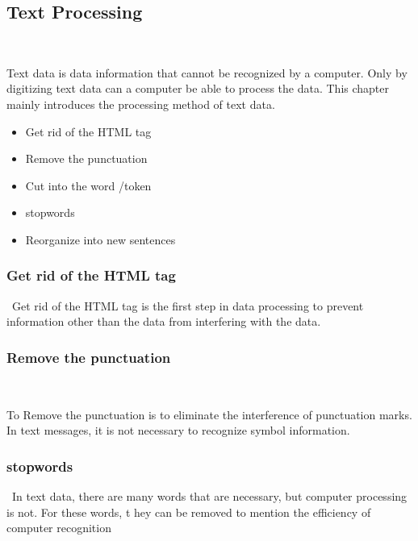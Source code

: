 \subsection{Text Processing}
\

Text data is data information that cannot be recognized by a computer. 
Only by digitizing text data can a computer be able to process the data.
This chapter mainly introduces the processing method of text data.

\begin{itemize}
	\item Get rid of the HTML tag
  \item Remove the punctuation
  \item Cut into the word /token
  \item stopwords
  \item Reorganize into new sentences
  \end{itemize}
\subsubsection{Get rid of the HTML tag}
\
Get rid of the HTML tag is the first step 
in data processing to prevent information other than the data 
from interfering with the data.


\subsubsection{Remove the punctuation}
\

To Remove the punctuation is to eliminate 
the interference of punctuation marks. In text messages, 
it is not necessary to recognize symbol information.
\subsubsection{stopwords}
\
In text data, there are many words that are necessary, 
but computer processing is not.
 For these words, t
 hey can be removed to mention the efficiency of computer recognition



